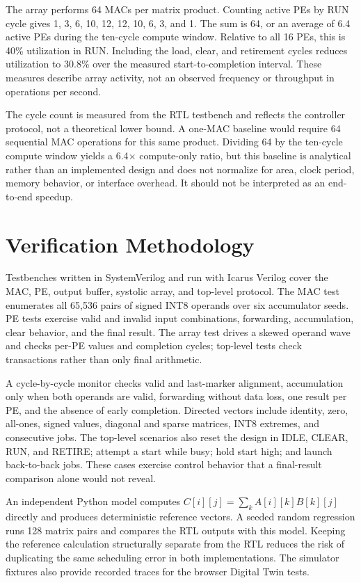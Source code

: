 \documentclass[conference]{IEEEtran}
\begin{document}
The array performs 64 MACs per matrix product. Counting active PEs by RUN cycle gives
1, 3, 6, 10, 12, 12, 10, 6, 3, and 1. The sum is 64, or an average of 6.4 active PEs during the ten-cycle compute
window. Relative to all 16 PEs, this is 40\% utilization in RUN. Including the load, clear, and retirement cycles
reduces utilization to 30.8\% over the measured start-to-completion interval. These measures describe array activity,
not an observed frequency or throughput in operations per second.

The cycle count is measured from the RTL testbench and reflects the controller protocol, not a theoretical lower bound.
A one-MAC baseline would require 64 sequential MAC operations for this same product. Dividing 64 by the ten-cycle
compute window yields a 6.4$\times$ compute-only ratio, but this baseline is analytical rather than an implemented
design and does not normalize for area, clock period, memory behavior, or interface overhead. It should not be
interpreted as an end-to-end speedup.

\section{Verification Methodology}
Testbenches written in SystemVerilog and run with Icarus Verilog cover the MAC, PE, output buffer, systolic array, and
top-level protocol. The MAC test enumerates all 65,536 pairs of signed INT8 operands over six accumulator seeds. PE
tests exercise valid and invalid input combinations, forwarding, accumulation, clear behavior, and the final result.
The array test drives a skewed operand wave and checks per-PE values and completion cycles; top-level tests check
transactions rather than only final arithmetic.

A cycle-by-cycle monitor checks valid and last-marker alignment, accumulation only when both operands are valid,
forwarding without data loss, one result per PE, and the absence of early completion. Directed vectors include identity,
zero, all-ones, signed values, diagonal and sparse matrices, INT8 extremes, and consecutive jobs. The top-level
scenarios also reset the design in IDLE, CLEAR, RUN, and RETIRE; attempt a start while busy; hold start high; and
launch back-to-back jobs. These cases exercise control behavior that a final-result comparison alone would not reveal.

An independent Python model computes $C[i][j]=\sum_k A[i][k]B[k][j]$ directly and produces deterministic reference
vectors. A seeded random regression runs 128 matrix pairs and compares the RTL outputs with this model. Keeping the
reference calculation structurally separate from the RTL reduces the risk of duplicating the same scheduling error in
both implementations. The simulator fixtures also provide recorded traces for the browser Digital Twin tests.
\end{document}
